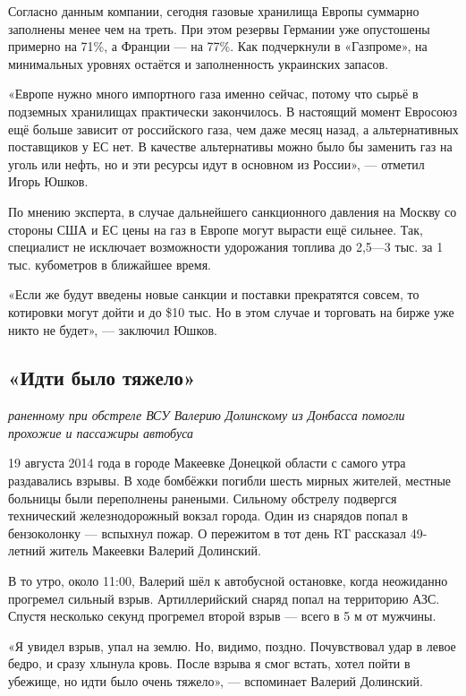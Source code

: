 Согласно данным компании, сегодня газовые хранилища Европы суммарно заполнены менее чем на треть. При этом резервы Германии уже опустошены примерно на 71\%, а Франции --- на 77\%. Как подчеркнули в «Газпроме», на минимальных уровнях остаётся и заполненность украинских запасов.

\begin{fancyquotes}
    «Европе нужно много импортного газа именно сейчас, потому что сырьё в подземных хранилищах практически закончилось. В настоящий момент Евросоюз ещё больше зависит от российского газа, чем даже месяц назад, а альтернативных поставщиков у ЕС нет. В качестве альтернативы можно было бы заменить газ на уголь или нефть, но и эти ресурсы идут в основном из России», --- отметил Игорь Юшков.
\end{fancyquotes}

По мнению эксперта, в случае дальнейшего санкционного давления на Москву со стороны США и ЕС цены на газ в Европе могут вырасти ещё сильнее. Так, специалист не исключает возможности удорожания топлива до 2,5---3 тыс. за 1 тыс. кубометров в ближайшее время.

«Если же будут введены новые санкции и поставки прекратятся совсем, то котировки могут дойти и до \$10 тыс. Но в этом случае и торговать на бирже уже никто не будет», --- заключил Юшков.

\subsection{«Идти было тяжело»}
\textit{раненному при обстреле ВСУ Валерию Долинскому из Донбасса помогли прохожие и пассажиры автобуса}

19 августа 2014 года в городе Макеевке Донецкой области с самого утра раздавались взрывы. В ходе бомбёжки погибли шесть мирных жителей, местные больницы были переполнены ранеными. Сильному обстрелу подвергся технический железнодорожный вокзал города. Один из снарядов попал в бензоколонку — вспыхнул пожар. О пережитом в тот день RT рассказал 49-летний житель Макеевки Валерий Долинский.

В то утро, около 11:00, Валерий шёл к автобусной остановке, когда неожиданно прогремел сильный взрыв. Артиллерийский снаряд попал на территорию АЗС. Спустя несколько секунд прогремел второй взрыв — всего в 5 м от мужчины.

«Я увидел взрыв, упал на землю. Но, видимо, поздно. Почувствовал удар в левое бедро, и сразу хлынула кровь. После взрыва я смог встать, хотел пойти в убежище, но идти было очень тяжело», — вспоминает Валерий Долинский.

